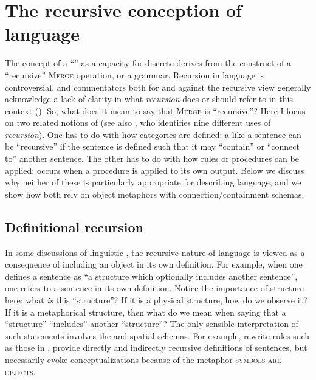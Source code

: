 \section{The recursive conception of language}

The concept of a “” as a capacity for discrete  derives from the construct of a “recursive” \textsc{Merge} operation, or a  grammar. Recursion in language is controversial, and commentators both for and against the recursive view generally acknowledge a lack of clarity in what \textit{recursion} does or should refer to in this context (\citealt{Lobina2011,PullumScholz2010,Tomalin2011,vanderHulst2010}). So, what does it mean to say that \textsc{Merge} is “recursive”? Here I focus on two related notions of  (see also \citealt{Tomalin2011}, who identifies nine different uses of \textit{recursion}). One has to do with how categories are defined: a  like a sentence can be “recursive” if the sentence is defined such that it may “contain” or “connect to” another sentence. The other has to do with how rules or procedures can be applied:  occurs when a procedure is applied to its own output. Below we discuss why neither of these is particularly appropriate for describing language, and we show how both rely on object metaphors with connection/containment schemas.

\subsection{Definitional recursion}

In some discussions of linguistic , the recursive nature of language is viewed as a consequence of including an object in its own definition. For example, when one defines a sentence as “a structure which optionally includes another sentence”, one refers to a sentence in its own definition. Notice the importance of structure here: what \textit{is} this “structure”? If it is a physical structure, how do we observe it? If it is a metaphorical structure, then what do we mean when saying that a “structure” “includes” another “structure”? The only sensible interpretation of such statements involves the  and spatial schemas. For example, rewrite rules such as those in {}, provide directly and indirectly recursive definitions of sentences, but necessarily evoke  conceptualizations because of the metaphor \textsc{symbols are objects}.

